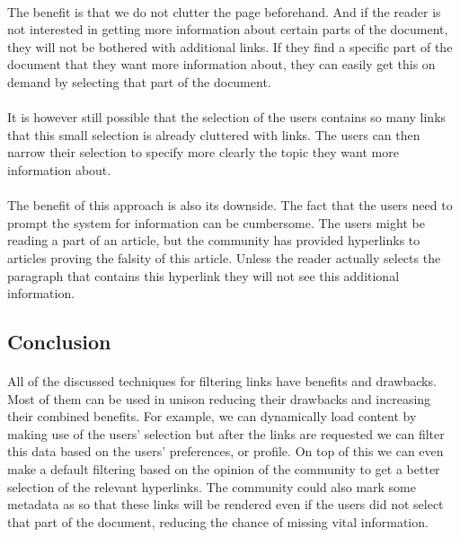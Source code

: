 	\paragraph{}
	The benefit is that we do not clutter the page beforehand. And if the reader is not interested in getting more information about certain parts of the document, they will not be bothered with additional links. If they find a specific part of the document that they want more information about, they can easily get this on demand by selecting that part of the document.
	\paragraph{}
	It is however still possible that the selection of the users contains so many links that this small selection is already cluttered with links. The users can then narrow their selection to specify more clearly the topic they want more information about.
	\paragraph{}
	The benefit of this approach is also its downside. The fact that the users need to prompt the system for information can be cumbersome. The users might be reading a part of an article, but the community has provided hyperlinks to articles proving the falsity of this article. Unless the reader actually selects the paragraph that contains this hyperlink they will not see this additional information.
	\subsection{Conclusion} \label{ssub:Conclusion}
	\paragraph{}
		All of the discussed techniques for filtering links have benefits and drawbacks. Most of them can be used in unison reducing their drawbacks and increasing their combined benefits. For example, we can dynamically load content by making use of the users' selection but after the links are requested we can filter this data based on the users' preferences, or profile. On top of this we can even make a default filtering based on the opinion of the community to get a better selection of the relevant hyperlinks. The community could also mark some metadata as  so that these links will be rendered even if the users did not select that part of the document, reducing the chance of missing vital information.
